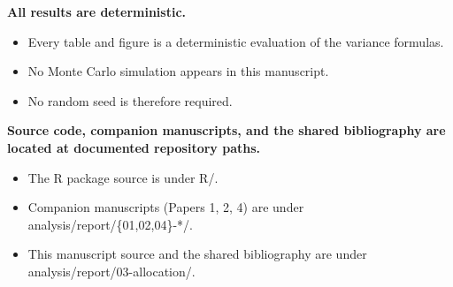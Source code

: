 \documentclass[
  11pt,
]{article}
\begin{document}
\textbf{All results are deterministic.}

\begin{itemize}\setlength{\itemsep}{2pt}\setlength{\parskip}{0pt}
\item Every table and figure is a deterministic evaluation of the variance formulas.
\item No Monte Carlo simulation appears in this manuscript.
\item No random seed is therefore required.
\end{itemize}

\textbf{Source code, companion manuscripts, and the shared bibliography are located at documented repository paths.}

\begin{itemize}\setlength{\itemsep}{2pt}\setlength{\parskip}{0pt}
\item The R package source is under R/.
\item Companion manuscripts (Papers 1, 2, 4) are under analysis/report/\{01,02,04\}-*/.
\item This manuscript source and the shared bibliography are under analysis/report/03-allocation/.
\end{itemize}
\end{document}

